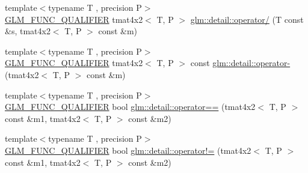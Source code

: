 \begin{DoxyCompactItemize}
\item 
{\footnotesize template$<$typename T , precision P$>$ }\\\hyperlink{setup_8hpp_a33fdea6f91c5f834105f7415e2a64407}{G\+L\+M\+\_\+\+F\+U\+N\+C\+\_\+\+Q\+U\+A\+L\+I\+F\+I\+ER} tmat4x2$<$ T, P $>$ \hyperlink{namespaceglm_1_1detail_af70176f21f252a3fd1bfadfe677af560}{glm\+::detail\+::operator/} (T const \&s, tmat4x2$<$ T, P $>$ const \&m)
\item 
{\footnotesize template$<$typename T , precision P$>$ }\\\hyperlink{setup_8hpp_a33fdea6f91c5f834105f7415e2a64407}{G\+L\+M\+\_\+\+F\+U\+N\+C\+\_\+\+Q\+U\+A\+L\+I\+F\+I\+ER} tmat4x2$<$ T, P $>$ const \hyperlink{namespaceglm_1_1detail_ac9110a5a1466c03ae2c0d83559cb5362}{glm\+::detail\+::operator-\/} (tmat4x2$<$ T, P $>$ const \&m)
\item 
{\footnotesize template$<$typename T , precision P$>$ }\\\hyperlink{setup_8hpp_a33fdea6f91c5f834105f7415e2a64407}{G\+L\+M\+\_\+\+F\+U\+N\+C\+\_\+\+Q\+U\+A\+L\+I\+F\+I\+ER} bool \hyperlink{namespaceglm_1_1detail_a5243bfd046c0f5d609100175da89bd30}{glm\+::detail\+::operator==} (tmat4x2$<$ T, P $>$ const \&m1, tmat4x2$<$ T, P $>$ const \&m2)
\item 
{\footnotesize template$<$typename T , precision P$>$ }\\\hyperlink{setup_8hpp_a33fdea6f91c5f834105f7415e2a64407}{G\+L\+M\+\_\+\+F\+U\+N\+C\+\_\+\+Q\+U\+A\+L\+I\+F\+I\+ER} bool \hyperlink{namespaceglm_1_1detail_a07bec06375ecb27d7b99b64c3f2c0e7e}{glm\+::detail\+::operator!=} (tmat4x2$<$ T, P $>$ const \&m1, tmat4x2$<$ T, P $>$ const \&m2)
\end{DoxyCompactItemize}

